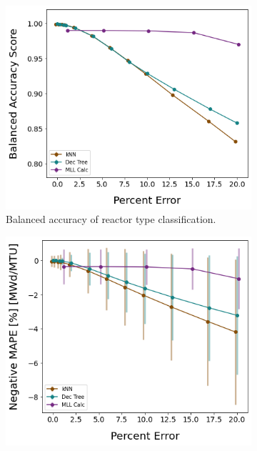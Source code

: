 \begin{figure}[!ht]
    \centering
    \begin{subfigure}[b]{0.49\textwidth}
        \centering
        \includegraphics[width=\textwidth]{./chapters/exp1/randerr_compare_nuc29_BalAcc_rxtr.png}
        \caption{Balanced accuracy of reactor type classification.}
        \label{fig:randerrA}
    \end{subfigure}
    \hfill
    \begin{subfigure}[b]{0.49\textwidth}
        \centering
        \includegraphics[width=\textwidth]{./chapters/exp1/randerr_compare_nuc29_MAPE_burn.png}

\end{subfigure}
\end{figure}
